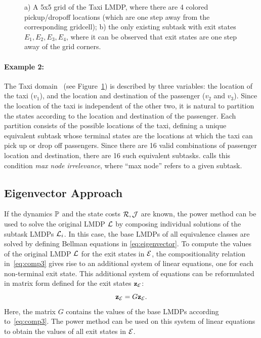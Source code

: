 \begin{figure}[!t]
    \begin{center}
        
    \end{center}
    \caption{a) A 5x5 grid of the Taxi LMDP, where there are 4 colored pickup/dropoff locations (which are one step away from the corresponding gridcell); b) the only existing subtask with exit states $E_1,E_2,E_3,E_4$, where it can be observed that exit states are one step away of the grid corners.} 
    \label{fig:domain_taxi}
\end{figure}
    

\paragraph{Example 2:} The Taxi domain~\citep{Dietterich2000} (see Figure~\ref{fig:domain_taxi}) is described by three variables: the location of the taxi ($v_1$), and the location and destination of the passenger ($v_2$ and $v_3$). Since the location of the taxi is independent of the other two, it is natural to partition the states according to the location and destination of the passenger. Each partition consists of the possible locations of the taxi, defining a unique equivalent subtask whose terminal states are the locations at which the taxi can pick up or drop off passengers. Since there are 16 valid combinations of passenger location and destination, there are 16 such equivalent subtasks.
\citep{Dietterich2000} calls this condition {\em max node irrelevance}, where ``max node'' refers to a given subtask.

\subsection{Eigenvector Approach}
\label{section:hlmdps_eigenvector_episodic}

If the dynamics $\mathbb{P}$ and the state costs $\mathcal{R}, \mathcal{J}$ are known, the power method can be used to solve the original LMDP $\mathcal{L}$ by composing individual solutions of the subtask LMDPs $\mathcal{L}_i$.
In this case, the base LMDPs of all equivalence classes are solved by defining Bellman equations in \eqref{eq:eigenvector}.
To compute the values of the original LMDP $\mathcal{L}$ for the exit states in $\mathcal{E}$, the compositionality relation in~\eqref{eq:comp3} gives rise to an additional system of linear equations, one for each non-terminal exit state. This additional system of equations can be reformulated in matrix form defined for the exit states ${\bf z}_{\mathcal{E}}$:
\begin{equation}\label{eq:exits}
{\bf z}_{\mathcal{E}}=G{\bf z}_{\mathcal{E}}.
\end{equation}
Here, the matrix $G$ contains the values of the base LMDPs according to~\eqref{eq:comp3}.
The power method can be used on this system of linear equations to obtain the values of all exit states in $\mathcal{E}$.

